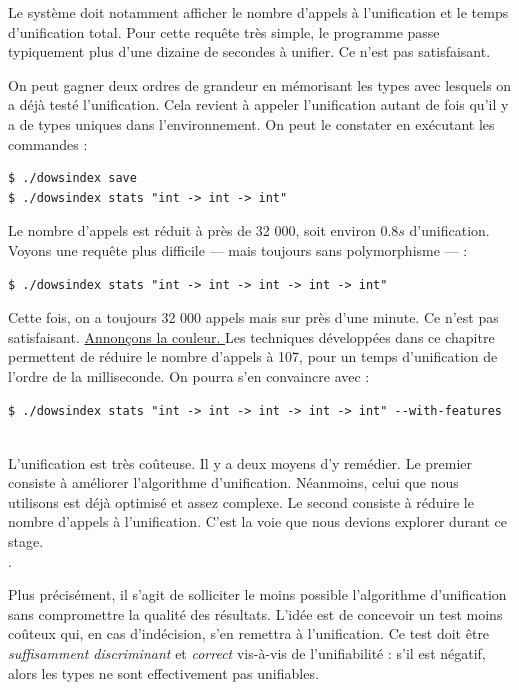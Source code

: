 \documentclass[a4paper]{report}
\theoremstyle{definition}
\newcommand\gab[1]{{\bf\color{Orange}{TODO: #1}}\\}
\newcommand\reformule[1]{\underline{#1}}
\begin{document}
Le système doit notamment afficher le nombre d'appels à l'unification et le temps d'unification total. Pour cette requête très simple, le programme passe typiquement plus d'une dizaine de secondes à unifier. Ce n'est pas satisfaisant.

On peut gagner deux ordres de grandeur en mémorisant les types avec lesquels on a déjà testé l'unification. Cela revient à appeler l'unification autant de fois qu'il y a de types uniques dans l'environnement. On peut le constater en exécutant les commandes :

\begin{verbatim}
$ ./dowsindex save
$ ./dowsindex stats "int -> int -> int"
\end{verbatim}

Le nombre d'appels est réduit à près de 32 000, soit environ $0.8s$ d'unification. Voyons une requête plus difficile — mais toujours sans polymorphisme — :

\begin{verbatim}
$ ./dowsindex stats "int -> int -> int -> int -> int"
\end{verbatim}

Cette fois, on a toujours 32 000 appels mais sur près d'une minute. Ce n'est pas satisfaisant. \reformule{Annonçons la couleur. }Les techniques développées dans ce chapitre permettent de réduire le nombre d'appels à 107, pour un temps d'unification de l'ordre de la milliseconde. On pourra s'en convaincre avec :

\begin{verbatim}
$ ./dowsindex stats "int -> int -> int -> int -> int" --with-features
\end{verbatim}

\gab{Le paragraph juste en dessous contient a peu près tout ce que tu veux dire. Tu n'as pas besoin de la pseudo-demo/ desargument pour dire que l'unification est couteuse, tu peux simplement l'affirmer. Le texte à partir d'ici est bien. }

L'unification est très coûteuse. Il y a deux moyens d'y remédier. Le premier consiste à améliorer l'algorithme d'unification. Néanmoins, celui que nous utilisons est déjà optimisé et assez complexe. Le second consiste à réduire le nombre d'appels à l'unification. C'est la voie que nous devions explorer durant ce stage.\gab{\og que j'ai exploré\fg}.

Plus précisément, il s'agit de solliciter le moins possible l'algorithme d'unification sans compromettre la qualité des résultats. L'idée est de concevoir un test moins coûteux qui, en cas d'indécision, s'en remettra à l'unification. Ce test doit être \emph{suffisamment discriminant} et \emph{correct} vis-à-vis de l'unifiabilité : s'il est négatif, alors les types ne sont effectivement pas unifiables.
\end{document}
